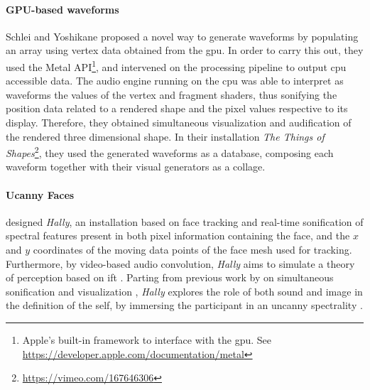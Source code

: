 \paragraph{GPU-based waveforms}
Schlei and Yoshikane \parencite{icmc/bbp2372.2016.056} proposed a novel way to generate waveforms by populating an array using vertex data obtained from the \gls{gpu}. In order to carry this out, they used the Metal API\footnote{Apple's built-in framework to interface with the \gls{gpu}. See \url{https://developer.apple.com/documentation/metal}}, and intervened on the processing pipeline to output \gls{cpu} accessible data. The audio engine running on the \gls{cpu} was able to interpret as waveforms the values of the vertex and fragment shaders, thus sonifying the position data related to a rendered shape and the pixel values respective to its display. Therefore, they obtained simultaneous visualization and audification of the rendered three dimensional shape. In their installation \textit{The Things of Shapes}\footnote{\url{https://vimeo.com/167646306}}, they used the generated waveforms as a database, composing each waveform together with their visual generators as a collage.

\paragraph{Ucanny Faces}
\citeauthor{fdch/installation/spectral} \parencite{fdch/installation/spectral} designed \textit{Hally}, an installation based on face tracking and real-time sonification of spectral features present in both pixel information containing the face, and the $x$ and $y$ coordinates of the moving data points of the face mesh used for tracking. Furthermore, by video-based audio convolution, \textit{Hally} aims to simulate a theory of perception based on \gls{ift} \parencite{connes:shapes}. Parting from previous work by \citeauthor{Sch07:How} on simultaneous sonification and visualization \parencite{Sch07:How}, \textit{Hally} explores the role of both sound and image in the definition of the self, by immersing the participant in an uncanny spectrality \parencite{fdch/papers/spectral}.



